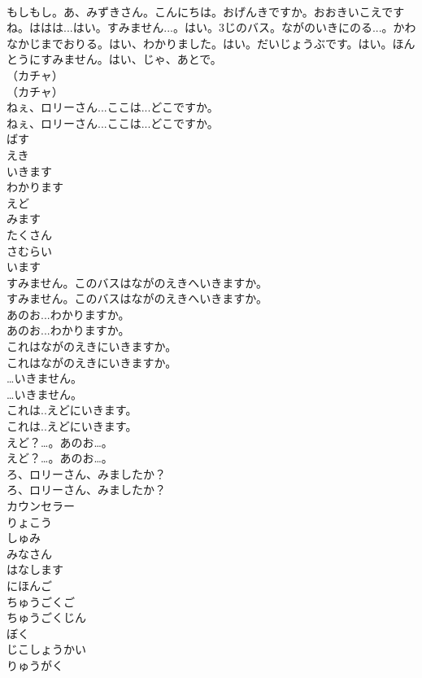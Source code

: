 \documentclass[8pt]{extreport}
\begin{document}
\begin{CJK}{UTF8}{min}
\\	もしもし。あ、みずきさん。こんにちは。おげんきですか。おおきいこえですね。ははは...はい。すみません...。はい。3じのバス。ながのいきにのる...。かわなかじまでおりる。はい、わかりました。はい。だいじょうぶです。はい。ほんとうにすみません。はい、じゃ、あとで。 
\\	（カチャ）	
\\	（カチャ） 
\\	ねぇ、ロリーさん...ここは...どこですか。	
\\	ねぇ、ロリーさん...ここは...どこですか。 
\\	ばす
\\	えき
\\	いきます
\\	わかります
\\	えど
\\	みます
\\	たくさん
\\	さむらい
\\	います
\\	すみません。このバスはながのえきへいきますか。	
\\	すみません。このバスはながのえきへいきますか。 
\\	あのお...わかりますか。	
\\	あのお...わかりますか。 
\\	これはながのえきにいきますか。	
\\	これはながのえきにいきますか。 
\\	…いきません。	
\\	…いきません。 
\\	これは..えどにいきます。	
\\	これは..えどにいきます。 
\\	えど？…。あのお…。	
\\	えど？…。あのお…。 
\\	ろ、ロリーさん、みましたか？	
\\	ろ、ロリーさん、みましたか？ 
\\	カウンセラー
\\	りょこう
\\	しゅみ
\\	みなさん
\\	はなします
\\	にほんご
\\	ちゅうごくご
\\	ちゅうごくじん
\\	ぼく
\\	じこしょうかい
\\	りゅうがく

\end{CJK}
\end{document}
